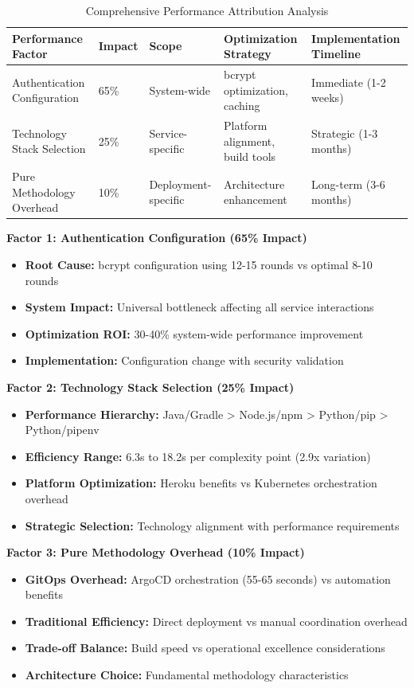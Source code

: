 \begin{table}[H]
\centering
\caption{Comprehensive Performance Attribution Analysis}
\label{tab:performance_attribution_detailed}
\begin{tabular}{|p{4cm}|p{2cm}|p{2.5cm}|p{4cm}|p{3cm}|}
\hline
\textbf{Performance Factor} & \textbf{Impact} & \textbf{Scope} & \textbf{Optimization Strategy} & \textbf{Implementation Timeline} \\
\hline
Authentication Configuration & 65\% & System-wide & bcrypt optimization, caching & Immediate (1-2 weeks) \\
\hline
Technology Stack Selection & 25\% & Service-specific & Platform alignment, build tools & Strategic (1-3 months) \\
\hline
Pure Methodology Overhead & 10\% & Deployment-specific & Architecture enhancement & Long-term (3-6 months) \\
\hline
\end{tabular}
\end{table}

\textbf{Factor 1: Authentication Configuration (65\% Impact)}
\begin{itemize}
\item \textbf{Root Cause:} bcrypt configuration using 12-15 rounds vs optimal 8-10 rounds
\item \textbf{System Impact:} Universal bottleneck affecting all service interactions
\item \textbf{Optimization ROI:} 30-40\% system-wide performance improvement
\item \textbf{Implementation:} Configuration change with security validation
\end{itemize}

\textbf{Factor 2: Technology Stack Selection (25\% Impact)}
\begin{itemize}
\item \textbf{Performance Hierarchy:} Java/Gradle > Node.js/npm > Python/pip > Python/pipenv
\item \textbf{Efficiency Range:} 6.3s to 18.2s per complexity point (2.9x variation)
\item \textbf{Platform Optimization:} Heroku benefits vs Kubernetes orchestration overhead
\item \textbf{Strategic Selection:} Technology alignment with performance requirements
\end{itemize}

\textbf{Factor 3: Pure Methodology Overhead (10\% Impact)}
\begin{itemize}
\item \textbf{GitOps Overhead:} ArgoCD orchestration (55-65 seconds) vs automation benefits
\item \textbf{Traditional Efficiency:} Direct deployment vs manual coordination overhead
\item \textbf{Trade-off Balance:} Build speed vs operational excellence considerations
\item \textbf{Architecture Choice:} Fundamental methodology characteristics
\end{itemize}

